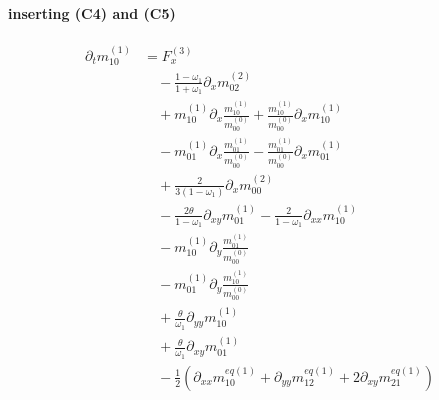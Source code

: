 \documentclass{article}
\begin{document}
  \paragraph{inserting (C4) and (C5)}
  \begin{equation*}
    \begin{aligned}
    \partial_t m_{10}^{(1)}
     & =
      F_x^{(3)}
      \\&\quad
      -\frac{1-\omega_1}{1+\omega_1} \partial_x m_{02}^{(2)}
      \\&\quad
      + m_{10}^{(1)}\partial_x \frac{  m_{10}^{(1)}}{m_{00}^{(0)}} + \frac{ m_{10}^{(1)}}{m_{00}^{(0)}} \partial_x  m_{10}^{(1)}
      \\&\quad
      - m_{01}^{(1)}\partial_x \frac{  m_{01}^{(1)}}{m_{00}^{(0)}} - \frac{ m_{01}^{(1)}}{m_{00}^{(0)}} \partial_x  m_{01}^{(1)}
      \\&\quad
      + \frac{ 2}{3(1-\omega_1)}\partial_x m_{00}^{(2)}
      \\&\quad
      - \frac{2\theta}{1-\omega_1}\partial_{xy} m_{01}^{(1)} - \frac{2}{1-\omega_1}\partial_{xx} m_{10}^{(1)}
      \\&\quad
      - m_{10}^{(1)}\partial_y \frac{ m_{01}^{(1)}}{m_{00}^{(0)}}
      \\&\quad
      - m_{01}^{(1)}\partial_y \frac{ m_{10}^{(1)}}{m_{00}^{(0)}}
      \\&\quad
      + \frac{\theta}{\omega_1}\partial_{yy} m_{10}^{(1)}
      \\&\quad
      + \frac{\theta}{\omega_1}\partial_{xy} m_{01}^{(1)}
      \\&\quad
      - \frac{1}{2} (\partial_{xx} m_{10}^{eq(1)} + \partial_{yy} m_{12}^{eq(1)} + 2\partial_{xy} m_{21}^{eq(1)})
    \end{aligned}
  \end{equation*}
\end{document}
